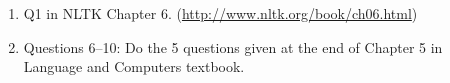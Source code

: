 \documentclass[11pt,a4paper]{article}
\begin{document}
\begin{enumerate}
\begin{table}[h]
\begin{center}
\begin{tabular}{r}
    \begin{tabular}{c|ccc}
    \hline
    (b) act. \texttt{\textbackslash} pred. $\rightarrow$&\textbf{A}&\textbf{B}&\textbf{C}\\
  \hline A & 431 & 158 & 6\\
  B & 66 & 1767 & 74\\
  C & 11 & 161 & 304 \\
\hline
  \end{tabular}
\end{tabular}
\caption{Confusion matrices comparison}
\label{tab:confmatrices}
\end{center}
\end{table}
\item Q1 in NLTK Chapter 6. (\url{http://www.nltk.org/book/ch06.html})
\item Questions 6--10: Do the 5 questions given at the end of Chapter 5 in Language and Computers textbook. 
\end{enumerate}
\end{document}
